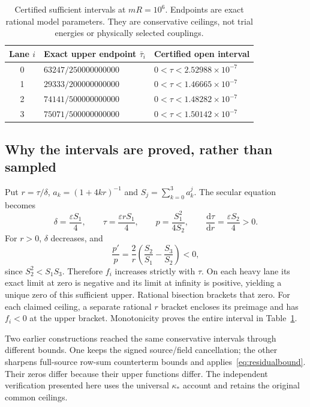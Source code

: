 \documentclass[11pt]{article}
\theoremstyle{definition}
\newcommand{\eps}{\varepsilon}
\newcommand{\dd}{\mathrm d}
\begin{document}
\begin{table}[ht]
\centering
\caption{Certified sufficient intervals at $mR=10^6$. Endpoints are exact rational model parameters. They are conservative ceilings, not trial energies or physically selected couplings.}\label{tab:intervals}
\begin{tabular}{@{}cll@{}}\toprule
Lane $i$ & Exact upper endpoint $\bar\tau_i$ & Certified open interval\\\midrule
0 & $63247/250000000000$ & $0<\tau<2.52988\times10^{-7}$\\
1 & $29333/200000000000$ & $0<\tau<1.46665\times10^{-7}$\\
2 & $74141/500000000000$ & $0<\tau<1.48282\times10^{-7}$\\
3 & $75071/500000000000$ & $0<\tau<1.50142\times10^{-7}$\\\bottomrule
\end{tabular}
\end{table}

\subsection{Why the intervals are proved, rather than sampled}

Put $r=\tau/\delta$, $a_k=(1+4kr)^{-1}$ and $S_j=\sum_{k=0}^3a_k^j$. The secular equation becomes
\begin{equation}\label{eq:parameter}
 \delta=\frac{\eps S_1}{4},\qquad
 \tau=\frac{\eps rS_1}{4},\qquad
 p=\frac{S_1^2}{4S_2},\qquad
 \frac{\dd\tau}{\dd r}=\frac{\eps S_2}{4}>0.
\end{equation}
For $r>0$, $\delta$ decreases, and
\begin{equation}\label{eq:pmonotone}
 \frac{p'}p=\frac2r\left(\frac{S_2}{S_1}-\frac{S_3}{S_2}\right)<0,
\end{equation}
since $S_2^2<S_1S_3$. Therefore $f_i$ increases strictly with $\tau$. On each heavy lane its exact limit at zero is negative and its limit at infinity is positive, yielding a unique zero of this sufficient upper. Rational bisection brackets that zero. For each claimed ceiling, a separate rational $r$ bracket encloses its preimage and has $f_i<0$ at the upper bracket. Monotonicity proves the entire interval in Table~\ref{tab:intervals}.

Two earlier constructions reached the same conservative intervals through different bounds. One keeps the signed source/field cancellation; the other sharpens full-source row-sum counterterm bounds and applies~\eqref{eq:residualbound}. Their zeros differ because their upper functions differ. The independent verification presented here uses the universal $\kappa_*$ account and retains the original common ceilings.
\end{document}
